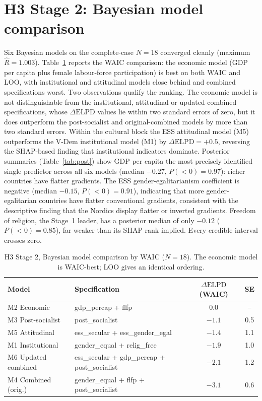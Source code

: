 \documentclass[12pt,a4paper]{report}
\begin{document}
\section{H3 Stage 2: Bayesian model comparison}
Six Bayesian models on the complete-case $N=18$ converged cleanly (maximum $\hat{R}=1.003$).
Table~\ref{tab:waic} reports the WAIC comparison: the economic model (GDP per capita plus female
labour-force participation) is best on both WAIC and LOO, with institutional and attitudinal models
close behind and combined specifications worst. Two observations qualify the ranking. The economic model is not distinguishable from the
institutional, attitudinal or updated-combined specifications, whose $\Delta\mathrm{ELPD}$ values lie
within two standard errors of zero, but it does outperform the post-socialist and
original-combined models by more than two standard errors. Within the cultural block the ESS
attitudinal model (M5)
outperforms the V-Dem institutional model (M1) by $\Delta\mathrm{ELPD}=+0.5$, reversing the
SHAP-based finding that institutional indicators dominate. Posterior summaries (Table~\ref{tab:post})
show GDP per capita the most precisely identified single predictor across all six models (median
$-0.27$, $P(<0)=0.97$): richer countries have flatter gradients. The ESS gender-egalitarianism
coefficient is negative (median $-0.15$, $P(<0)=0.91$), indicating that more gender-egalitarian
countries have flatter conventional gradients, consistent with the descriptive
finding that the Nordics display flatter or inverted gradients. Freedom of religion, the Stage~1
leader, has a posterior median of only $-0.12$ ($P(<0)=0.85$), far weaker than its SHAP rank implied.
Every credible interval crosses zero.

\begin{table}[ht]
\centering
\caption{H3 Stage 2, Bayesian model comparison by WAIC ($N=18$). The economic model is WAIC-best; LOO gives an identical ordering.}
\label{tab:waic}
\small
\begin{tabular}{@{}llcc@{}}
\toprule
Model & Specification & $\Delta\mathrm{ELPD}$ (WAIC) & SE \\
\midrule
M2 Economic         & gdp\_percap + flfp & 0.0 & -- \\
M3 Post-socialist   & post\_socialist & $-1.1$ & 0.5 \\
M5 Attitudinal      & ess\_secular + ess\_gender\_egal & $-1.4$ & 1.1 \\
M1 Institutional    & gender\_equal + relig\_free & $-1.9$ & 1.0 \\
M6 Updated combined & ess\_secular + gdp\_percap + post\_socialist & $-2.1$ & 1.2 \\
M4 Combined (orig.) & gender\_equal + flfp + post\_socialist & $-3.1$ & 0.6 \\
\bottomrule
\end{tabular}
\end{table}
\end{document}
